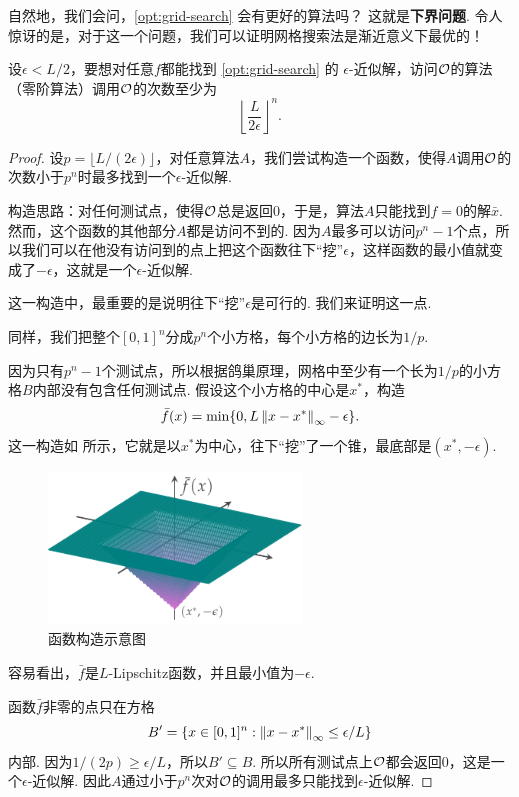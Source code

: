 自然地，我们会问，\eqref{opt:grid-search} 会有更好的算法吗？ 这就是\textbf{下界问题}. 令人惊讶的是，对于这一个问题，我们可以证明网格搜索法是渐近意义下最优的！

\begin{theorem}\label{thm:grid-search-lower-bound}
    设$\epsilon<L/2$，要想对任意$f$都能找到 \eqref{opt:grid-search} 的 $\epsilon$-近似解，访问$\mathcal{O}$的算法（零阶算法）调用$\mathcal{O}$的次数至少为
    \[\left\lfloor\frac{L}{2\epsilon}\right\rfloor^n.\]
\end{theorem}
\begin{proof}
设$p=\lfloor L/(2\epsilon)\rfloor$，对任意算法$A$，我们尝试构造一个函数，使得$A$调用$\mathcal{O}$的次数小于$p^n$时最多找到一个$\epsilon$-近似解.

构造思路：对任何测试点，使得$\mathcal{O}$总是返回$0$，于是，算法$A$只能找到$f=0$的解$\bar{x}$. 然而，这个函数的其他部分$A$都是访问不到的. 因为$A$最多可以访问$p^n-1$个点，所以我们可以在他没有访问到的点上把这个函数往下“挖”$\epsilon$，这样函数的最小值就变成了$-\epsilon$，这就是一个$\epsilon$-近似解.

这一构造中，最重要的是说明往下“挖”$\epsilon$是可行的. 我们来证明这一点.

同样，我们把整个$[0,1]^n$分成$p^n$个小方格，每个小方格的边长为$1/p$. 

因为只有$p^n-1$个测试点，所以根据鸽巢原理，网格中至少有一个长为$1/p$的小方格$B$内部没有包含任何测试点. 假设这个小方格的中心是$x^*$，构造
    \[\bar f(x)=\min\{0,L\left\|x-x^*\right\|_\infty-\epsilon\}.\]
这一构造如 所示，它就是以$x^*$为中心，往下“挖”了一个锥，最底部是$(x^*,-\epsilon)$.

\begin{figure}[H]
    \centering
    \includegraphics[width=0.6\textwidth]{figures/convex-anlaysis/grid-func.pdf}
    \caption{函数构造示意图}
    \label{fig:grid-func}
\end{figure}

容易看出，$\bar f$是$L$-Lipschitz函数，并且最小值为$-\epsilon$.

函数$\bar f$非零的点只在方格
    \[B'=\{x\in[0,1]^n:\left\|x-x^*\right\|_\infty\leq\epsilon/L\}\]
内部. 因为$1/(2p)\geq \epsilon/L$，所以$B'\subseteq B$. 所以所有测试点上$\mathcal{O}$都会返回$0$，这是一个$\epsilon$-近似解. 因此$A$通过小于$p^n$次对$\mathcal{O}$的调用最多只能找到$\epsilon$-近似解.
\end{proof}

